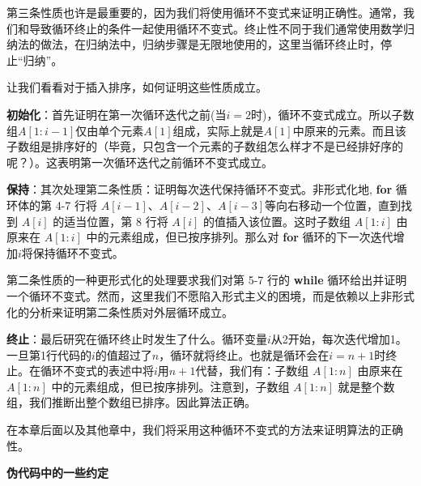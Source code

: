 \documentclass[lang=cn,newtx,10pt,scheme=chinese]{elegantbook}
\begin{document}
第三条性质也许是最重要的，因为我们将使用循环不变式来证明正确性。通常，我们和导致循环终止的条件一起使用循环不变式。终止性不同于我们通常使用数学归纳法的做法，在归纳法中，归纳步骤是无限地使用的，这里当循环终止时，停止``归纳''。

让我们看看对于插入排序，如何证明这些性质成立。

\textbf{初始化}：首先证明在第一次循环迭代之前(当$i=2$时)，循环不变式成立。所以子数组$A[1:i-1]$仅由单个元素$A[1]$组成，实际上就是$A[1]$中原来的元素。而且该子数组是排序好的（毕竟，只包含一个元素的子数组怎么样才不是已经排好序的呢？）。这表明第一次循环迭代之前循环不变式成立。

\textbf{保持}：其次处理第二条性质：证明每次迭代保持循环不变式。非形式化地, \textbf{for} 循环体的第 4-7 行将 $A[i-1]$、$A[i-2]$、$A[i-3]$等向右移动一个位置，直到找到 $A[i]$ 的适当位置，第 8 行将 $A[i]$ 的值插入该位置。这时子数组 $A[1:i]$ 由原来在 $A[1:i]$ 中的元素组成，但已按序排列。那么对 \textbf{for} 循环的下一次迭代增加$i$将保持循环不变式。

第二条性质的一种更形式化的处理要求我们对第 5-7 行的 \textbf{while} 循环给出并证明一个循环不变式。然而，这里我们不愿陷入形式主义的困境，而是依赖以上非形式化的分析来证明第二条性质对外层循环成立。

\textbf{终止}：最后研究在循环终止时发生了什么。循环变量$i$从2开始，每次迭代增加1。一旦第1行代码的$i$的值超过了$n$，循环就将终止。也就是循环会在$i=n+1$时终止。在循环不变式的表述中将$i$用$n+1$代替，我们有：子数组 $A[1:n]$ 由原来在 $A[1:n]$ 中的元素组成，但已按序排列。注意到，子数组 $A[1:n]$ 就是整个数组，我们推断出整个数组已排序。因此算法正确。

在本章后面以及其他章中，我们将采用这种循环不变式的方法来证明算法的正确性。

\textbf{伪代码中的一些约定}
\end{document}
